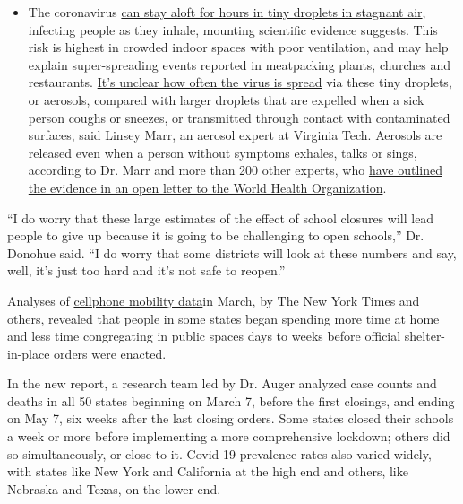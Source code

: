\begin{itemize}
  \begin{itemize}
  \tightlist
  \item
    The coronavirus
    \href{https://www.nytimes3xbfgragh.onion/2020/07/04/health/239-experts-with-one-big-claim-the-coronavirus-is-airborne.html?action=click\&pgtype=Article\&state=default\&region=MAIN_CONTENT_3\&context=storylines_faq}{can
    stay aloft for hours in tiny droplets in stagnant air}, infecting
    people as they inhale, mounting scientific evidence suggests. This
    risk is highest in crowded indoor spaces with poor ventilation, and
    may help explain super-spreading events reported in meatpacking
    plants, churches and restaurants.
    \href{https://www.nytimes3xbfgragh.onion/2020/07/06/health/coronavirus-airborne-aerosols.html?action=click\&pgtype=Article\&state=default\&region=MAIN_CONTENT_3\&context=storylines_faq}{It's
    unclear how often the virus is spread} via these tiny droplets, or
    aerosols, compared with larger droplets that are expelled when a
    sick person coughs or sneezes, or transmitted through contact with
    contaminated surfaces, said Linsey Marr, an aerosol expert at
    Virginia Tech. Aerosols are released even when a person without
    symptoms exhales, talks or sings, according to Dr. Marr and more
    than 200 other experts, who
    \href{https://academic.oup.com/cid/article/doi/10.1093/cid/ciaa939/5867798}{have
    outlined the evidence in an open letter to the World Health
    Organization}.
  \end{itemize}
\end{itemize}

``I do worry that these large estimates of the effect of school closures
will lead people to give up because it is going to be challenging to
open schools,'' Dr. Donohue said. ``I do worry that some districts will
look at these numbers and say, well, it's just too hard and it's not
safe to reopen.''

Analyses of
\href{https://www.nytimes3xbfgragh.onion/interactive/2020/04/02/us/coronavirus-social-distancing.html}{cellphone
mobility data}in March, by The New York Times and others, revealed that
people in some states began spending more time at home and less time
congregating in public spaces days to weeks before official
shelter-in-place orders were enacted.

In the new report, a research team led by Dr. Auger analyzed case counts
and deaths in all 50 states beginning on March 7, before the first
closings, and ending on May 7, six weeks after the last closing orders.
Some states closed their schools a week or more before implementing a
more comprehensive lockdown; others did so simultaneously, or close to
it. Covid-19 prevalence rates also varied widely, with states like New
York and California at the high end and others, like Nebraska and Texas,
on the lower end.

